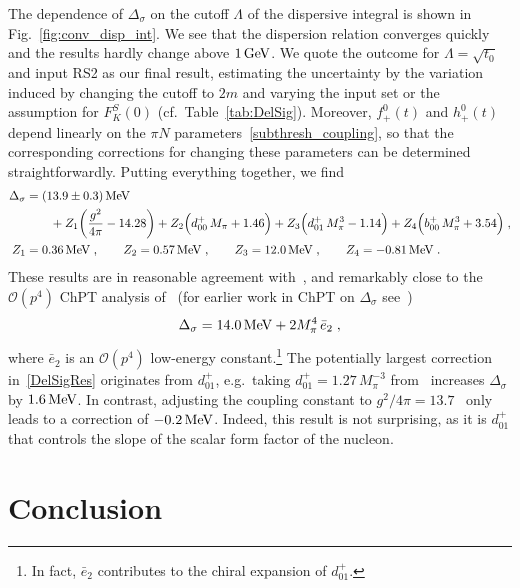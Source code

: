 \documentclass[11pt]{article}%
\providecommand{\ec}{\;,}
\providecommand{\ep}{\;.}
\providecommand{\nt}{\notag}
\newcommand{\mpi}{M_{\pi}}
\newcommand{\beq}{\begin{equation}}
\newcommand{\eeq}{\end{equation}}
\newcommand{\Order}{\mathcal{O}}
\begin{document}
The dependence of $\Delta_\sigma$ on the cutoff $\Lambda$ of the dispersive integral is shown in Fig.~\ref{fig:conv_disp_int}. We see that the dispersion relation converges quickly and the results hardly change above $1\,{\rm GeV}$. We quote the outcome for $\Lambda=\sqrt{t_0}$ and input RS2 as our final result, estimating the uncertainty by the variation induced by changing the cutoff to $2m$ and varying the input set or the assumption for $F^S_K(0)$ (cf.\ Table~\ref{tab:DelSig}). Moreover, $f^0_+(t)$ and $h^0_+(t)$ depend linearly on the $\pi N$ parameters~\eqref{subthresh_coupling}, so that the corresponding corrections for changing these parameters can be determined straightforwardly. Putting everything together, we find
\begin{align}
\label{DelSigRes}
 \Delta_\sigma&=(13.9\pm 0.3)\,{\rm MeV}\nt\\
&\qquad+ Z_1 \bigg(\frac{g^2}{4\pi}-14.28\bigg)+ Z_2\Big(d_{00}^+\,\mpi+1.46\Big)+
Z_3\Big(d_{01}^+\,\mpi^{3}-1.14\Big)+Z_4\Big(b_{00}^+\,\mpi^{3}+3.54\Big)\ec\nt\\
Z_1&=0.36\,{\rm MeV}\ec\qquad Z_2= 0.57\,{\rm MeV}\ec\qquad Z_3= 12.0\,{\rm MeV}\ec\qquad Z_4=-0.81\,{\rm MeV}\ep
\end{align}
These results are in reasonable agreement with~\cite{GLS90_FF}, and remarkably close to the $\Order(p^4)$ ChPT analysis of~\cite{BL99} (for earlier work in ChPT on $\Delta_\sigma$ see~\cite{Pagels71,Gasser82,GSS88,BKM93})
\beq
\Delta_\sigma=14.0\,{\rm MeV}+2\mpi^4\, \bar e_2\ec
\eeq
where $\bar e_2$ is an $\Order(p^4)$ low-energy constant.\footnote{In fact, $\bar e_2$ contributes to the chiral expansion of $d_{01}^+$.} The potentially largest correction in~\eqref{DelSigRes} originates from $d_{01}^+$, e.g.\ taking $d_{01}^+=1.27\,\mpi^{-3}$ from~\cite{GWU98} increases $\Delta_\sigma$ by $1.6\,{\rm MeV}$. In contrast, adjusting the coupling constant to $g^2/4\pi=13.7$~\cite{piNcoupling:short,piNcoupling:long} only leads to a correction of $-0.2\,{\rm MeV}$. Indeed, this result is not surprising, as it is $d_{01}^+$ that controls the slope of the scalar form factor of the nucleon.
  

\section{Conclusion}
\label{sec:concl}
\end{document}
